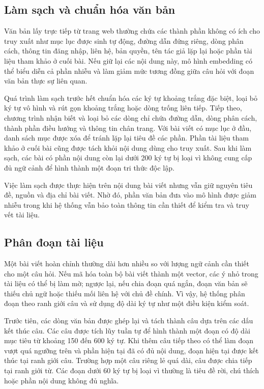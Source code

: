 \documentclass[a4paper,13pt,twoside]{report}
\begin{document}
\subsection{Làm sạch và chuẩn hóa văn bản}

Văn bản lấy trực tiếp từ trang web thường chứa các thành phần không có ích cho truy xuất như mục lục được sinh tự động, đường dẫn đứng riêng, dòng phân cách, thông tin đăng nhập, liên hệ, bản quyền, tên tác giả lặp lại hoặc phần tài liệu tham khảo ở cuối bài. Nếu giữ lại các nội dung này, mô hình embedding có thể biểu diễn cả phần nhiễu và làm giảm mức tương đồng giữa câu hỏi với đoạn văn bản thực sự liên quan.

Quá trình làm sạch trước hết chuẩn hóa các ký tự khoảng trắng đặc biệt, loại bỏ ký tự vô hình và rút gọn khoảng trắng hoặc dòng trống liên tiếp. Tiếp theo, chương trình nhận biết và loại bỏ các dòng chỉ chứa đường dẫn, dòng phân cách, thành phần điều hướng và thông tin chân trang. Với bài viết có mục lục ở đầu, danh sách mục được xóa để tránh lặp lại tiêu đề các phần. Phần tài liệu tham khảo ở cuối bài cũng được tách khỏi nội dung dùng cho truy xuất. Sau khi làm sạch, các bài có phần nội dung còn lại dưới 200 ký tự bị loại vì không cung cấp đủ ngữ cảnh để hình thành một đoạn tri thức độc lập.

Việc làm sạch được thực hiện trên nội dung bài viết nhưng vẫn giữ nguyên tiêu đề, nguồn và địa chỉ bài viết. Nhờ đó, phần văn bản đưa vào mô hình được giảm nhiễu trong khi hệ thống vẫn bảo toàn thông tin cần thiết để kiểm tra và truy vết tài liệu.

\subsection{Phân đoạn tài liệu}

Một bài viết hoàn chỉnh thường dài hơn nhiều so với lượng ngữ cảnh cần thiết cho một câu hỏi. Nếu mã hóa toàn bộ bài viết thành một vector, các ý nhỏ trong tài liệu có thể bị làm mờ; ngược lại, nếu chia đoạn quá ngắn, đoạn văn bản sẽ thiếu chủ ngữ hoặc thiếu mối liên hệ với chủ đề chính. Vì vậy, hệ thống phân đoạn theo ranh giới câu và sử dụng độ dài ký tự như một điều kiện kiểm soát.

Trước tiên, các dòng văn bản được ghép lại và tách thành câu dựa trên các dấu kết thúc câu. Các câu được tích lũy tuần tự để hình thành một đoạn có độ dài mục tiêu từ khoảng 150 đến 600 ký tự. Khi thêm câu tiếp theo có thể làm đoạn vượt quá ngưỡng trên và phần hiện tại đã có đủ nội dung, đoạn hiện tại được kết thúc tại ranh giới câu. Trường hợp một câu riêng lẻ quá dài, câu được chia tiếp tại ranh giới từ. Các đoạn dưới 60 ký tự bị loại vì thường là tiêu đề rời, chú thích hoặc phần nội dung không đủ nghĩa.
\end{document}
